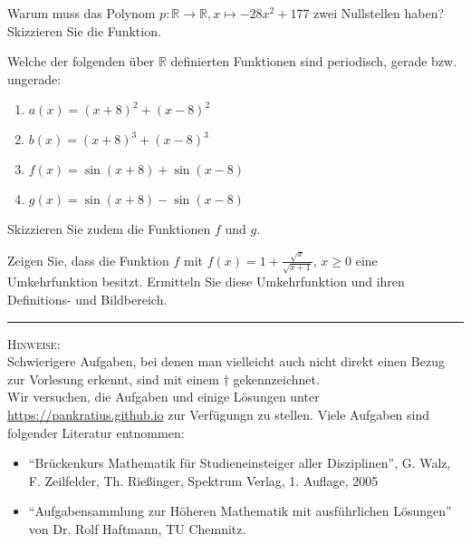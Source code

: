 \documentclass[11pt]{article}
\begin{document}
\begin{task}
	Warum muss das Polynom $p:\mathbb{R}\to \mathbb{R},x\mapsto -28x^2+177$ zwei Nullstellen haben? Skizzieren Sie die Funktion.
\end{task}
\begin{task}
Welche der folgenden \"uber $\mathbb{R}$ definierten Funktionen sind periodisch, gerade bzw. ungerade:
\begin{enumerate}
	\item $a(x)=(x+8)^2+(x-8)^2$
	\item $b(x)=(x+8)^3+(x-8)^3$
	\item $f(x)=\sin(x+8)+\sin(x-8)$
	\item $g(x)=\sin(x+8)-\sin(x-8)$
\end{enumerate}
Skizzieren Sie zudem die Funktionen $f$ und $g$.
\end{task}
\begin{htask}
	Zeigen Sie, dass die Funktion $f$ mit $f(x)=1+\frac{\sqrt{x}}{\sqrt{x+1}}$, $x \geq 0$ eine Umkehrfunktion besitzt. Ermitteln Sie diese Umkehrfunktion und ihren Definitions- und Bildbereich.
\end{htask}

\hrule
\vspace{.5cm}
\noindent
\textsc{Hinweise:}\\
Schwierigere Aufgaben, bei denen man vielleicht auch nicht direkt einen Bezug zur Vorlesung erkennt, sind mit einem $\dagger$ gekennzeichnet.\\
Wir versuchen, die Aufgaben und einige Lösungen unter \url{https://pankratius.github.io} zur Verfügungn zu stellen.
Viele Aufgaben sind folgender Literatur entnommen:
\begin{itemize}
	\item ``Br\"uckenkurs Mathematik f\"ur Studieneinsteiger aller Disziplinen'', G. Walz, F. Zeilfelder, Th. Rie\ss inger, Spektrum Verlag, 1. Auflage, 2005
	\item ``Aufgabensammlung zur H\"oheren Mathematik mit ausf\"uhrlichen L\"osungen'' von Dr. Rolf Haftmann, TU Chemnitz.
\end{itemize}
\end{document}
